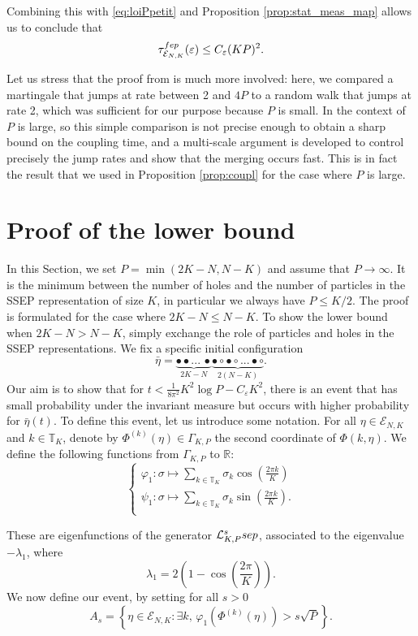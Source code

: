 \documentclass[11pt,a4paper]{article}
\newcommand{\R}{\mathbb{R}}
\newcommand{\T}{\mathbb{T}}
\newcommand{\FEP}{\textsc{fep}}
\newcommand{\SSEP}{\textsc{ssep}}
\newcommand{\eqs}[1]{\begin{equation}#1\end{equation}}
\newcommand{\eq}[2]{\begin{equation}\label{#1}#2\end{equation}}
\begin{document}
Combining this with \eqref{eq:loiPpetit} and Proposition \ref{prop:stat_meas_map} allows us to conclude that 
\eqs{\tau^{\FEP}_{\mathcal{E}_{N,K}}(\varepsilon) \le  C_\varepsilon (KP)^2.}

Let us stress that the proof from \cite{lacoin_simple_2017} is much more involved: here, we compared a martingale that jumps at rate between 2 and $4P$ to a random walk that jumps at rate 2, which was sufficient for our purpose because $P$ is small. In the context of \cite{lacoin_simple_2017} $P$ is large, so this simple comparison is not precise enough to obtain a sharp bound on the coupling time, and a multi-scale argument is developed to control precisely the jump rates and show that the merging occurs fast. This is in fact the result that we used in Proposition \ref{prop:coupl} for the case where $P$ is large.


\section{Proof of the lower bound }\label{sec:b}
In this Section, we set $P = \min(2K-N,N-K)$ and assume that $P\to \infty$. It is the minimum between the number of holes and the number of particles in the SSEP representation of size $K$, in particular we always have $P\le K/2$. The proof is formulated for the case where $2K-N \le N-K$. To show the lower bound when $2K-N > N-K$, simply exchange the role of particles and holes in the SSEP representations. We fix a specific initial configuration 
\eq{eq=eta_lb}{\bar{\eta} = \underbrace{\bullet \bullet ... \,\bullet}_{2K-N}\underbrace{\bullet\circ\bullet\circ ...\bullet\circ}_{2(N-K)}.} 
Our aim is to show that for $t < \frac{1}{8 \pi^2} K^2 \log P - C_\varepsilon K^2$, there is an event that has small probability under the invariant measure but occurs with higher probability for $\bar{\eta}(t) $.
To define this event, let us introduce some notation. For all $\eta \in \mathcal{E}_{N,K}$ and $k\in \T_K$, denote by $\Phi^{(k)}(\eta) \in \Gamma_{K,P}$ the second coordinate of $\Phi(k,\eta)$. 
We define the following functions from $\Gamma_{K,P}$ to $\R$: 
\eqs{\begin{cases}\varphi_1:\sigma \mapsto \sum_{k\in \T_K} \sigma_k \cos\left(\frac{2\pi k}{K}\right) \\
\psi_1:\sigma\mapsto \sum_{k\in \T_K} \sigma_k \sin\left(\frac{2\pi k}{K}\right). \\
\end{cases}}

These are eigenfunctions of the generator $\mathcal{L}_{K,P}^\SSEP$, associated to the eigenvalue $-\lambda_1$, where
\eqs{\lambda_1 = 2\left(1-\cos\left(\frac{2\pi}{K}\right)\right).}
We now define our event, by setting for all $s> 0$
\eqs{A_s = \left\{\eta \in \mathcal{E}_{N,K} : \exists k, \, \varphi_1\left(\Phi^{(k)}(\eta)\right)  > s \sqrt{P}\right\}.}
\end{document}
